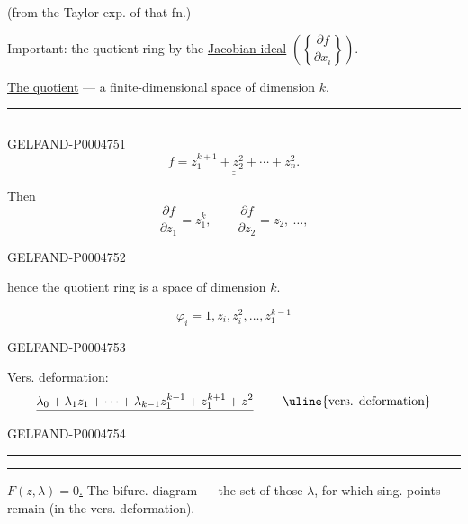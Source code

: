 (from the Taylor exp. of that fn.)

Important: the quotient ring by the \uline{Jacobian ideal}
$\left(\left\{\dfrac{\partial f}{\partial x_i}\right\}\right)$.

\uline{The quotient} — a finite-dimensional space of dimension $k$.

{\centering\rule{2.9em}{.4pt}\quad\textperiodcentered\quad\rule{3.4em}{.4pt}\par}


\begin{GelfandAdjacentEvidence}{GELFAND-P000475}{1}
\[
\underline{\underline{f=z_1^{k+1}+z_2^2+\cdots+z_n^2.}}
\]

Then
\[
\frac{\partial f}{\partial z_1}=z_1^k,\qquad
\frac{\partial f}{\partial z_2}=z_2,\ \ldots,
\]
\end{GelfandAdjacentEvidence}
\begin{GelfandAdjacentEvidence}{GELFAND-P000475}{2}

hence the quotient ring is a space of dimension $k$.

\[
\varphi_i=1,z_i,z_i^2,\ldots,z_1^{k-1}
\]
\end{GelfandAdjacentEvidence}
\begin{GelfandAdjacentEvidence}{GELFAND-P000475}{3}


Vers. deformation:
\[
\underline{\lambda_0+\lambda_1z_1+\cdots+\lambda_{k-1}z_1^{k-1}
+z_1^{k+1}+z^2}
\quad\text{— \uline{vers. deformation}}
\]
\end{GelfandAdjacentEvidence}
\begin{GelfandAdjacentEvidence}{GELFAND-P000475}{4}


{\centering\rule{2.8em}{.4pt}\quad\textperiodcentered\quad\rule{3.2em}{.4pt}\par}
\uline{\mbox{$F(z,\lambda)=0$}.}\qquad
The bifurc. diagram — the set of those $\lambda$, for which sing. points remain (in the vers. deformation).

\end{GelfandAdjacentEvidence}
